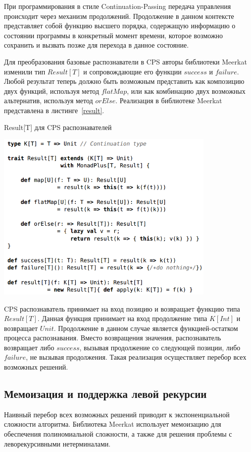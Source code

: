 При программирования в стиле Continuation-Passing передача управления происходит через механизм продолжений. Продолжение в данном контексте представляет собой функцию высшего порядка, содержащую информацию о состоянии программы в конкретный момент времени, которое возможно сохранить и вызвать позже для перехода в данное состояние.

Для преобразования базовые распознаватели в CPS авторы библиотеки Meerkat изменили тип $Result[T]$ и сопровождающие его функции $success$ и $failure$. Любой результат теперь должно быть возможным представить как композицию двух функций, используя метод $flatMap$, или как комбинацию двух возможных альтернатив, используя метод $orElse$. Реализация в библиотеке Meerkat представлена в листинге~\ref{result}.

\begin{listing}
\caption{Result[T] для CPS распознавателей}
\label{result}
\centering
\includegraphics[width=0.8\textwidth]{Smolina/pics/result.png}
\end{listing}

CPS распознаватель принимает на вход позицию и возвращает функцию типа $Result[T]$. Данная функция принимает на вход продолжение типа $K[Int]$ и возвращает $Unit$. Продолжение в данном случае является функцией-остатком процесса распознавания. Вместо возвращения значения, распознаватель возвращает либо $success$, вызывая продолжение со следующей позиции, либо $failure$, не вызывая продолжения. Такая реализация осуществляет перебор всех возможных решений. 

\subsection{Мемоизация и поддержка левой рекурсии}
Наивный перебор всех возможных решений приводит к экспоненциальной сложности алгоритма. Библиотека Meerkat использует мемоизацию для обеспечения полиномиальной сложности, а также для решения проблемы с леворекурсивными нетерминалами.

